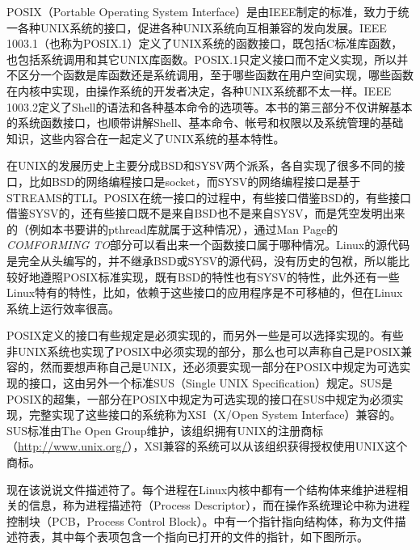 \begin{BookNote}


POSIX（Portable Operating System Interface）是由IEEE制定的标准，致力于统一各种UNIX系统的接口，促进各种UNIX系统向互相兼容的发向发展。IEEE 1003.\BookSplit{}1（也称为POSIX.\BookSplit{}1）定义了UNIX系统的函数接口，既包括C标准库函数，也包括系统调用和其它UNIX库函数。POSIX.\BookSplit{}1只定义接口而不定义实现，所以并不区分一个函数是库函数还是系统调用，至于哪些函数在用户空间实现，哪些函数在内核中实现，由操作系统的开发者决定，各种UNIX系统都不太一样。IEEE 1003.\BookSplit{}2定义了Shell的语法和各种基本命令的选项等。本书的第三部分不仅讲解基本的系统函数接口，也顺带讲解Shell、基本命令、帐号和权限以及系统管理的基础知识，这些内容合在一起定义了UNIX系统的基本特性。



在UNIX的发展历史上主要分成BSD和SYSV两个派系，各自实现了很多不同的接口，比如BSD的网络编程接口是socket，而SYSV的网络编程接口是基于STREAMS的TLI。POSIX在统一接口的过程中，有些接口借鉴BSD的，有些接口借鉴SYSV的，还有些接口既不是来自BSD也不是来自SYSV，而是凭空发明出来的（例如本书要讲的pthread库就属于这种情况），通过Man Page的\emph{COMFORMING TO}部分可以看出来一个函数接口属于哪种情况。Linux的源代码是完全从头编写的，并不继承BSD或SYSV的源代码，没有历史的包袱，所以能比较好地遵照POSIX标准实现，既有BSD的特性也有SYSV的特性，此外还有一些Linux特有的特性，比如，依赖于这些接口的应用程序是不可移植的，但在Linux系统上运行效率很高。



POSIX定义的接口有些规定是必须实现的，而另外一些是可以选择实现的。有些非UNIX系统也实现了POSIX中必须实现的部分，那么也可以声称自己是POSIX兼容的，然而要想声称自己是UNIX，还必须要实现一部分在POSIX中规定为可选实现的接口，这由另外一个标准SUS（Single UNIX Specification）规定。SUS是POSIX的超集，一部分在POSIX中规定为可选实现的接口在SUS中规定为必须实现，完整实现了这些接口的系统称为XSI（X/\BookSplit{}Open System Interface）兼容的。SUS标准由The Open Group维护，该组织拥有UNIX的注册商标（\url{http://www.unix.org/}），XSI兼容的系统可以从该组织获得授权使用UNIX这个商标。

\end{BookNote}


现在该说说文件描述符了。每个进程在Linux内核中都有一个结构体来维护进程相关的信息，称为进程描述符（Process Descriptor），而在操作系统理论中称为进程控制块（PCB，Process Control Block）。中有一个指针指向结构体，称为文件描述符表，其中每个表项包含一个指向已打开的文件的指针，如下图所示。


